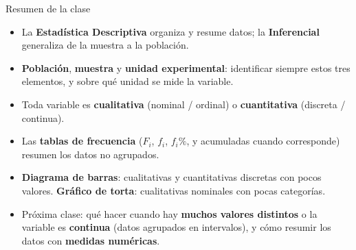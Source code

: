 \documentclass[aspectratio=169,11pt]{beamer}
\begin{document}
\begin{frame}{Resumen de la clase}
\begin{itemize}
\item La \textbf{Estadística Descriptiva} organiza y resume datos; la \textbf{Inferencial} generaliza de la muestra a la población.
\item \textbf{Población}, \textbf{muestra} y \textbf{unidad experimental}: identificar siempre estos tres elementos, y sobre qué unidad se mide la variable.
\item Toda variable es \textbf{cualitativa} (nominal / ordinal) o \textbf{cuantitativa} (discreta / continua).
\item Las \textbf{tablas de frecuencia} ($F_i$, $f_i$, $f_i\%$, y acumuladas cuando corresponde) resumen los datos no agrupados.
\item \textbf{Diagrama de barras}: cualitativas y cuantitativas discretas con pocos valores. \textbf{Gráfico de torta}: cualitativas nominales con pocas categorías.
\item Próxima clase: qué hacer cuando hay \textbf{muchos valores distintos} o la variable es \textbf{continua} (datos agrupados en intervalos), y cómo resumir los datos con \textbf{medidas numéricas}.
\end{itemize}
\end{frame}
\end{document}
